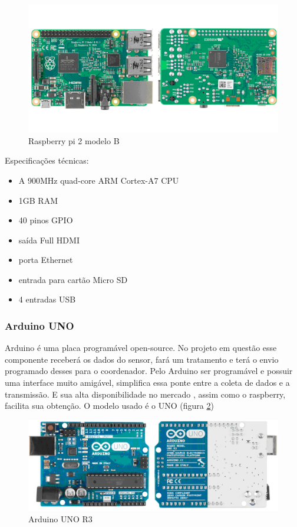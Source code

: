 \begin{figure}[H]
\includegraphics[width=1\textwidth]{figuras/raspberry_pi.png}
\caption{\label{fig:raspberry pi} Raspberry pi 2 modelo B}
\end{figure}

Especificações técnicas:
\begin{itemize}
\item{A 900MHz quad-core ARM Cortex-A7 CPU}
\item{1GB RAM}
\item{40 pinos GPIO}
\item{saída Full HDMI}
\item{porta Ethernet}
\item{entrada para cartão Micro SD}
\item{4 entradas USB}
\end{itemize}
%
\subsubsection{Arduino UNO}

Arduino \cite{arduino_site} é uma placa programável open-source. No projeto em questão esse componente receberá os dados do sensor, fará um tratamento e terá o envio programado desses para o coordenador. Pelo Arduino ser programável e possuir uma interface muito amigável, simplifica essa ponte entre a coleta de dados e a transmissão. E sua alta disponibilidade no mercado , assim como o raspberry, facilita sua obtenção. O modelo usado é o UNO (figura \ref{fig:arduino uno})

\begin{figure}[H]
\includegraphics[width=1\textwidth]{figuras/arduino_uno.png}
\caption{\label{fig:arduino uno} Arduino UNO R3}
\end{figure}

